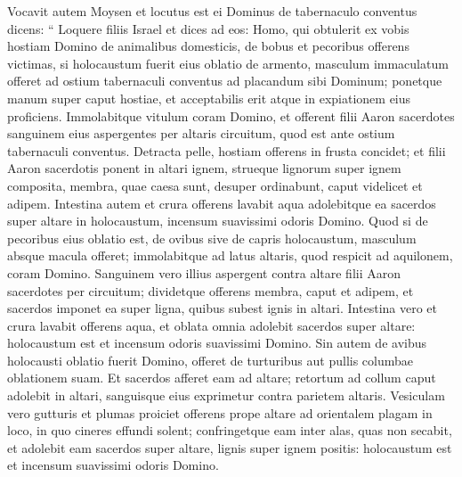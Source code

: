\begin{biblechapter}
 \verse Vocavit autem Moysen et locutus est ei Dominus de tabernaculo conventus dicens: 
\verse “ Loquere filiis Israel et dices ad eos: Homo, qui obtulerit ex vobis hostiam Domino de animalibus domesticis, de bobus et pecoribus offerens victimas, 
\verse si holocaustum fuerit eius oblatio de armento, masculum immaculatum offeret ad ostium tabernaculi conventus ad placandum sibi Dominum; 
\verse ponetque manum super caput hostiae, et acceptabilis erit atque in expiationem eius proficiens. 
\verse Immolabitque vitulum coram Domino, et offerent filii Aaron sacerdotes sanguinem eius aspergentes per altaris circuitum, quod est ante ostium tabernaculi conventus. 
 \verse Detracta pelle, hostiam offerens in frusta concidet; 
\verse et filii Aaron sacerdotis ponent in altari ignem, strueque lignorum super ignem composita, 
 \verse membra, quae caesa sunt, desuper ordinabunt, caput videlicet et adipem. 
\verse Intestina autem et crura offerens lavabit aqua adolebitque ea sacerdos super altare in holocaustum, incensum suavissimi odoris Domino.
 \verse Quod si de pecoribus eius oblatio est, de ovibus sive de capris holocaustum, masculum absque macula offeret; 
\verse immolabitque ad latus altaris, quod respicit ad aquilonem, coram Domino. Sanguinem vero illius aspergent contra altare filii Aaron sacerdotes per circuitum; 
\verse dividetque offerens membra, caput et adipem, et sacerdos imponet ea super ligna, quibus subest ignis in altari. 
\verse Intestina vero et crura lavabit offerens aqua, et oblata omnia adolebit sacerdos super altare: holocaustum est et incensum odoris suavissimi Domino.
 \verse Sin autem de avibus holocausti oblatio fuerit Domino, offeret de turturibus aut pullis columbae oblationem suam. 
\verse Et sacerdos afferet eam ad altare; retortum ad collum caput adolebit in altari, sanguisque eius exprimetur contra parietem altaris. 
\verse Vesiculam vero gutturis et plumas proiciet offerens prope altare ad orientalem plagam in loco, in quo cineres effundi solent; 
\verse confringetque eam inter alas, quas non secabit, et adolebit eam sacerdos super altare, lignis super ignem positis: holocaustum est et incensum suavissimi odoris Domino.
 

\end{biblechapter}
